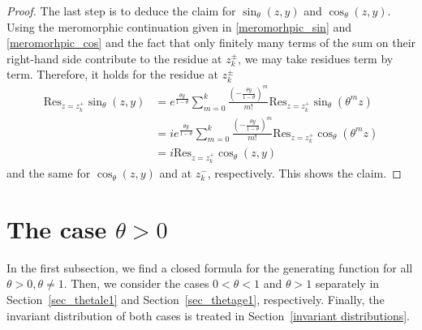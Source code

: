 \documentclass[10pt,a4paper]{amsart}
\newcommand{\1}{\mathds{1}}
\begin{document}
\begin{proof}
    The last step is to deduce the claim for $\sin_\theta(z,y)$ and $\cos_\theta(z,y)$. Using  the meromorphic continuation given in \eqref{meromorhpic_sin} and \eqref{meromorhpic_cos} and the fact that only finitely many terms of the sum on their right-hand side contribute to the residue at $z_k^\pm$, we may take residues term by term. Therefore, it holds for the residue at $z_k^\pm$
    \begin{align*}
        \mathrm{Res}_{z=z_k^+}\sin_\theta(z,y)&=e^{\frac{\theta y}{1-\theta}}\sum_{m=0}^k\frac{\left(-\frac{\theta y}{1-\theta}\right)^m}{m!}\mathrm{Res}_{z=z_k^+}\sin_\theta(\theta^m z)
        \\&=ie^{\frac{\theta y}{1-\theta}}\sum_{m=0}^k\frac{\left(-\frac{\theta y}{1-\theta}\right)^m}{m!}\mathrm{Res}_{z=z_k^+}\cos_\theta(\theta^m z)
        \\&=i\mathrm{Res}_{z=z_k^+}\cos_\theta(z,y)
    \end{align*}
    and the same for $\cos_\theta(z,y)$ and at $z_k^-$, respectively. This shows the claim.
 \end{proof}
\section{The case \texorpdfstring{$\theta>0$}{theta>0}}\label{sec_theta_pos}
In the first subsection, we find a closed formula for the generating function for all $\theta>0,\theta\neq 1$.
Then, we consider the cases $0<\theta<1$ and $\theta>1$ separately in Section~\ref{sec_thetale1} and Section~\ref{sec_thetage1}, respectively. Finally, the invariant distribution of both cases is treated in Section~\ref{invariant distributions}.
\end{document}
